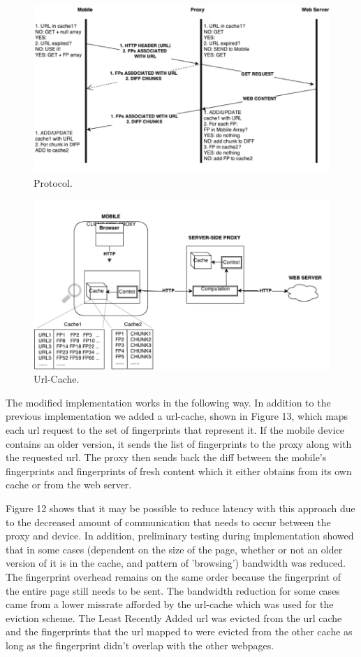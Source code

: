 \begin{figure}[h] 
\centering \includegraphics[scale=0.40]{images/urlcache-protocol.png}
\caption{Protocol. }
\end{figure} 
\begin{figure}[h] 
\centering \includegraphics[scale=0.40]{images/url-cache-hl.png}
\caption{Url-Cache. }
\end{figure} 

The modified implementation works in the following way. In addition to the previous implementation we added a url-cache, shown in Figure 13, which maps each url request to the set of fingerprints that represent it. If the mobile device contains an older version, it sends the list of fingerprints to the proxy along with the requested url. The proxy then sends back the diff between the mobile's fingerprints and fingerprints of fresh content which it either obtains from its own cache or from the web server. 

Figure 12 shows that it may be possible to reduce latency with this approach due to the decreased amount of communication that needs to occur between the proxy and device. In addition, preliminary testing during implementation showed that in some cases (dependent on the size of the page, whether or not an older version of it is in the cache, and pattern of 'browsing') bandwidth was reduced. The fingerprint overhead remains on the same order because the fingerprint of the entire page still needs to be sent. The bandwidth reduction for some cases came from a lower missrate afforded by the url-cache which was used for the eviction scheme. The Least Recently Added url was evicted from the url cache and the fingerprints that the url mapped to were evicted from the other cache as long as the fingerprint didn't overlap with the other webpages.

